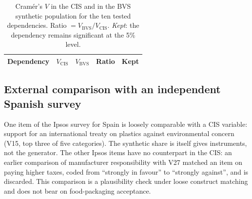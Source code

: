 \begin{table}[htbp]
\centering
\caption{Cram\'er's $V$ in the CIS and in the BVS synthetic population for the
ten tested dependencies. Ratio $= V_{\mathrm{BVS}} / V_{\mathrm{CIS}}$.
\emph{Kept}: the dependency remains significant at the 5\% level.}
\label{tab:vratios}
\small
\begin{tabular}{lcccc}
\toprule
\textbf{Dependency} & $V_{\mathrm{CIS}}$ & $V_{\mathrm{BVS}}$ &
  \textbf{Ratio} & \textbf{Kept} \\
\midrule
\bottomrule
\end{tabular}
\end{table}


\subsection{External comparison with an independent Spanish survey}
\label{sec:res_ipsos}

One item of the Ipsos survey for Spain \citep{ipsos2022} is loosely comparable
with a CIS variable: support for an international treaty on plastics against
environmental concern (V15, top three of five categories). The synthetic share
is %
itself gives %
instruments, not the generator. The other Ipsos items have no counterpart in
the CIS: an earlier comparison of manufacturer responsibility with V27 matched
an item on paying higher taxes, coded from ``strongly in favour'' to ``strongly
against'', and is discarded. This comparison is a plausibility check under
loose construct matching and does not bear on food-packaging acceptance.

